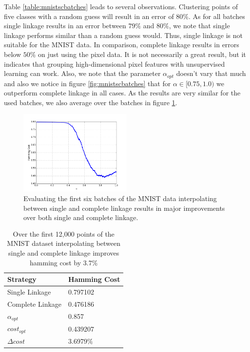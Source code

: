 Table \ref{table:mnistscbatches} leads to several observations. Clustering points of five classes with a random guess will result in an error of $80\%$. As for all batches single linkage results in an error between $79\%$ and $80\%$, we note that single linkage performs similar than a random guess would. Thus, single linkage is not suitable for the MNIST data. In comparison, complete linkage results in errors below $50\%$ on just using the pixel data. It is not necessarily a great result, but it indicates that grouping high-dimensional pixel features with unsupervised learning can work. Also, we note that the parameter $\alpha_{opt}$ doesn't vary that much and also we notice in figure \ref{fig:mnistscbatches} that for $\alpha \in [0.75,1.0)$ we outperform complete linkage in all cases. As the results are very similar for the used batches, we also average over the batches in figure \ref{fig:mnistscbatchesavg}.

\begin{figure}[h]
    \centering
    \includegraphics[width=0.5\textwidth]{plots/mnist-sc-averaged.png}
    \caption{Evaluating the first six batches of the MNIST data interpolating between single and complete linkage results in major improvements over both single and complete linkage.}
    \label{fig:mnistscbatchesavg}
\end{figure}

\begin{table}[H]
    \centering
    \begin{tabular}{|l | l |}
    \hline
    Strategy & Hamming Cost\\ \hline
    Single Linkage & 0.797102\\
    Complete Linkage & 0.476186\\
    $\alpha_{opt}$ & 0.857\\
    $cost_{opt}$ & 0.439207\\
    $\Delta cost$ & 3.6979\%\\\hline
    \end{tabular}
    \caption{Over the first 12,000 points of the MNIST dataset interpolating between single and complete linkage improves hamming cost by $3.7\%$ }
    \label{table:mnist1000avgsc}
\end{table}

